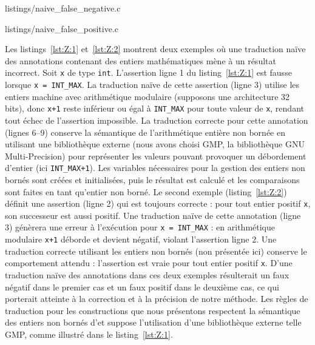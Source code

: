 
                {listings/naive_false_negative.c}


                {listings/naive_false_positive.c}


Les listings~\ref{lst:Z:1} et~\ref{lst:Z:2} montrent deux exemples où
une traduction naïve des annotations contenant des entiers mathématiques mène
à un résultat incorrect.
Soit \lstinline'x' de type \lstinline'int'.
L'assertion ligne 1 du listing~\ref{lst:Z:1} est fausse lorsque
\lstinline'x = INT_MAX'.
La traduction naïve de cette assertion (ligne 3) utilise les entiers machine
avec arithmétique modulaire (supposons une architecture 32 bits), donc
\lstinline'x+1' reste inférieur ou égal à \lstinline'INT_MAX' pour toute valeur
de \lstinline'x', rendant tout échec de l'assertion impossible.
La traduction correcte pour cette annotation (lignes 6--9) conserve la
sémantique de l'arithmétique entière non bornée en utilisant une bibliothèque
externe (nous avons choisi GMP, la bibliothèque GNU Multi-Precision) pour
représenter les valeurs pouvant provoquer un débordement d'entier (ici
\lstinline'INT_MAX+1').
Les variables nécessaires pour la gestion des entiers non bornés sont créées et
initialisées, puis le résultat est calculé et les comparaisons sont faites en
tant qu'entier non borné.
Le second exemple (listing~\ref{lst:Z:2}) définit une assertion \eacsl (ligne 2)
qui est toujours correcte : pour tout entier positif \lstinline'x', son
successeur est aussi positif.
Une traduction naïve de cette annotation (ligne 3) génèrera une erreur à
l'exécution pour \lstinline'x = INT_MAX' : en arithmétique modulaire
\lstinline'x+1' déborde et devient négatif, violant l'assertion ligne 2.
Une traduction correcte utilisant les entiers non bornés (non présentée ici)
conserve le comportement attendu : l'assertion est vraie pour tout entier
positif \lstinline'x'.
D'une traduction naïve des annotations dans ces deux exemples résulterait un
faux négatif dans le premier cas et un faux positif dans le deuxième cas, ce
qui porterait atteinte à la correction et à la précision de notre méthode.
Les règles de traduction pour les constructions \eacsl que nous présentons
respectent la sémantique des entiers non bornés d'\eacsl et suppose
l'utilisation d'une bibliothèque externe telle GMP, comme illustré dans le
listing~\ref{lst:Z:1}.



